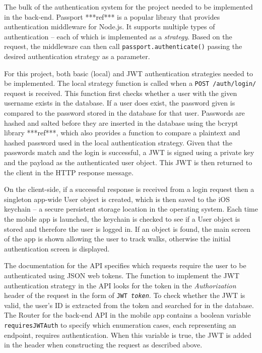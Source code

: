The bulk of the authentication system for the project needed to be implemented in the back-end. Passport ***ref*** is a popular library that provides authentication middleware for Node.js. It supports multiple types of authentication -- each of which is implemented as a \textit{strategy}. Based on the request, the middleware can then call \verb|passport.authenticate()| passing the desired authentication strategy as a parameter.

For this project, both basic (local) and JWT authentication strategies needed to be implemented. The local strategy function is called when a \verb|POST /auth/login/| request is received. This function first checks whether a user with the given username exists in the database. If a user does exist, the password given is compared to the password stored in the database for that user. Passwords are hashed and salted before they are inserted in the database using the bcrypt library ***ref***, which also provides a function to compare a plaintext and hashed password used in the local authentication strategy. Given that the passwords match and the login is successful, a JWT is signed using a private key and the payload as the authenticated user object. This JWT is then returned to the client in the HTTP response message.

On the client-side, if a successful response is received from a login request then a singleton app-wide User object is created, which is then saved to the iOS keychain -- a secure persistent storage location in the operating system. Each time the mobile app is launched, the keychain is checked to see if a User object is stored and therefore the user is logged in. If an object is found, the main screen of the app is shown allowing the user to track walks, otherwise the initial authentication screen is displayed.

The documentation for the API specifies which requests require the user to be authenticated using JSON web tokens. The function to implement the JWT authentication strategy in the API looks for the token in the \textit{Authorization} header of the request in the form of \texttt{JWT \textit{token}}. To check whether the JWT is valid, the user's ID is extracted from the token and searched for in the database. The Router for the back-end API in the mobile app contains a boolean variable \verb|requiresJWTAuth| to specify which enumeration cases, each representing an endpoint, requires authentication. When this variable is true, the JWT is added in the header when constructing the request as described above.

